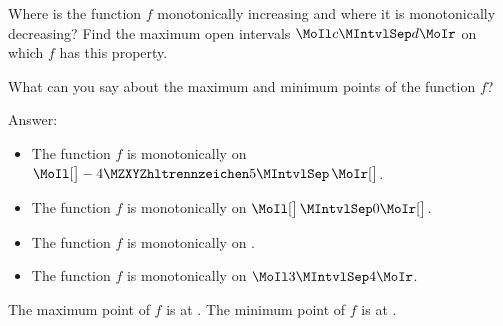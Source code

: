 \begin{MExercises}
\begin{MExercise}
\begin{center}
\end{center}

\begin{MExerciseItems}
\item Where is the function $f$ monotonically increasing and where it is monotonically decreasing?
Find the maximum open intervals $\MoIl c\MIntvlSep d\MoIr$ on which $f$ has this property.
%
\item What can you say about the maximum and minimum points of the function $f$?
\end{MExerciseItems}

Answer:
\begin{itemize}
\item The function $f$ is monotonically  on 
  $\MoIl[\big] -\MZahl{4}{5}\MIntvlSep $$\MoIr[\big]$.
%
\item The function $f$ is monotonically  on 
  $\MoIl[\big]$$\MIntvlSep 0\MoIr[\big]$.
%
\item The function $f$ is monotonically  on
  .
%
\item The function $f$ is monotonically 
  on $\MoIl 3\MIntvlSep 4\MoIr$.
\end{itemize}
The maximum point of $f$ is at .
The minimum point of $f$ is at .


\end{MExercise}
\end{MExercises}

